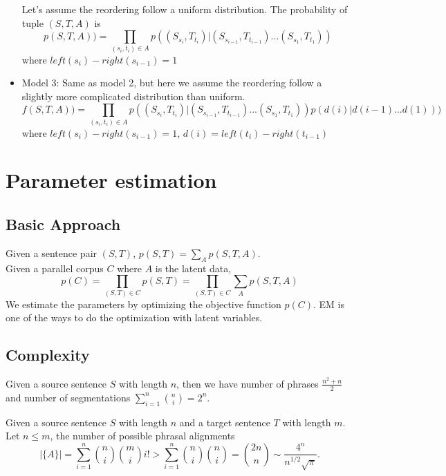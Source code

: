 \documentclass[11pt, letterpaper]{article}   	%
\begin{document}
\begin{itemize}
Let's assume the reordering follow a uniform distribution.
The probability of tuple $(S,T,A)$ is 
\begin{equation} \label{eq:obj2}
p(S,T,A))=\prod_{(s_i,t_i) \in A} p((S_{s_i},T_{t_i})| (S_{s_{i-1}},T_{t_{i-1}}) ... (S_{s_{1}},T_{t_{1}}))
\end{equation}
where $left(s_i)- right(s_{i-1})=1$

\item Model 3:
Same as model 2, but here we assume the reordering follow a slightly more complicated distribution than uniform.
\begin{equation} \label{eq:obj3}
f(S,T,A))=\prod_{(s_i,t_i) \in A} p((S_{s_i},T_{t_i})| (S_{s_{i-1}},T_{t_{i-1}}) ... (S_{s_{1}},T_{t_{1}})) p(d(i) | d(i-1) ... d(1)) )
\end{equation}
where $left(s_i)- right(s_{i-1})=1$, \quad $d(i)=left(t_i)- right(t_{i-1})$
\end{itemize}

\section{Parameter estimation}
\subsection{Basic Approach}
Given a sentence pair $(S,T)$, $p(S,T)=\sum_{A}p(S,T,A)$.\\
Given a parallel corpus $C$ where $A$ is the latent data, 
\begin{equation}p(C)=\prod_{(S,T) \in C} p(S,T)=\prod_{(S,T) \in C} \sum_{A} p(S,T,A) \end{equation}
We estimate the parameters by optimizing the objective function $p(C)$. EM is one of the ways to do the optimization with latent variables.

\subsection{Complexity}
Given a source sentence $S$ with length $n$, then we have number of phrases $\frac{n^2+n}{2}$ and number of segmentations $\sum\limits_{i=1}^n {n \choose i} = 2^n$. 

Given a source sentence $S$ with length $n$ and a target sentence $T$ with length $m$.  Let $n \leqslant m $, the number of possible phrasal alignments 
\begin{equation}
|\{A\}|= \sum \limits_{i=1}^n {n \choose i}{m \choose i}i!  > \sum \limits_{i=1}^n {n \choose i}{n \choose i} = {2n \choose n} \sim \frac{4^n}{n^{1/2} \sqrt{\pi}}.
\end{equation}
\end{document}
